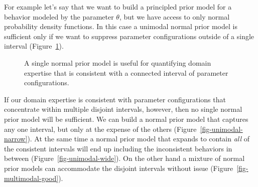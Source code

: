 \documentclass[
  letterpaper,
  DIV=11,
  numbers=noendperiod]{scrartcl}
\begin{document}
For example let's say that we want to build a principled prior model for
a behavior modeled by the parameter \(\theta\), but we have access to
only normal probability density functions. In this case a unimodal
normal prior model is sufficient only if we want to suppress parameter
configurations outside of a single interval
(Figure~\ref{fig-unimodal-good}).

\begin{figure}


\caption{\label{fig-unimodal-good}A single normal prior model is useful
for quantifying domain expertise that is consistent with a connected
interval of parameter configurations.}

\end{figure}%

If our domain expertise is consistent with parameter configurations that
concentrate within multiple disjoint intervals, however, then no single
normal prior model will be sufficient. We can build a normal prior model
that captures any one interval, but only at the expense of the others
(Figure~\ref{fig-unimodal-narrow}). At the same time a normal prior
model that expands to contain \emph{all} of the consistent intervals
will end up including the inconsistent behaviors in between
(Figure~\ref{fig-unimodal-wide}). On the other hand a mixture of normal
prior models can accommodate the disjoint intervals without issue
(Figure~\ref{fig-multimodal-good}).
\end{document}
